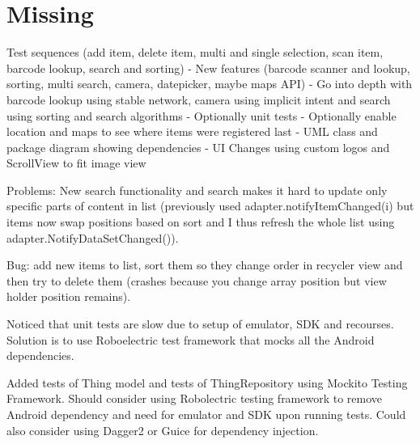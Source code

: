 \documentclass{article}
\begin{document}
\section{Missing}
Test sequences (add item, delete item, multi and single selection, scan item, barcode lookup, search and sorting)
- New features (barcode scanner and lookup, sorting, multi search, camera, datepicker, maybe maps API)
- Go into depth with barcode lookup using stable network, camera using implicit intent and search using sorting and search algorithms 
- Optionally unit tests 
- Optionally enable location and maps to see where items were registered last 
- UML class and package diagram showing dependencies 
- UI Changes using custom logos and ScrollView to fit image view 

Problems:
New search functionality and search makes it hard to update only specific parts of content in list (previously used adapter.notifyItemChanged(i) but items now swap positions based on sort and I thus refresh the whole list using adapter.NotifyDataSetChanged()).

Bug: add new items to list, sort them so they change order in recycler view and then try to delete them (crashes because you change array position but view holder position remains). 

Noticed that unit tests are slow due to setup of emulator, SDK and recourses. Solution is to use Roboelectric test framework that mocks all the Android dependencies. 

Added tests of Thing model and tests of ThingRepository using Mockito Testing Framework. 
Should consider using Robolectric testing framework to remove Android dependency and need for emulator and SDK upon running tests.
Could also consider using Dagger2 or Guice for dependency injection. 

	
\end{document}
